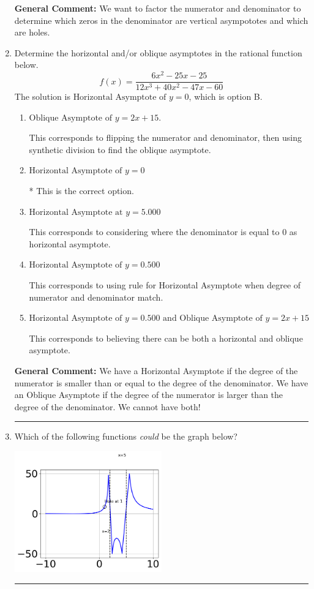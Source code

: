 \documentclass{extbook}[14pt]
\newcommand{\litem}[1]{\item #1

\rule{\textwidth}{0.4pt}}
\begin{document}
\begin{enumerate}
{\textbf{General Comment:} We want to factor the numerator and denominator to determine which zeros in the denominator are vertical asympototes and which are holes.
}
\litem{
Determine the horizontal and/or oblique asymptotes in the rational function below.
\[ f(x) = \frac{6x^{2} -25 x -25}{12x^{3} +40 x^{2} -47 x -60} \]The solution is \( \text{Horizontal Asymptote of } y = 0 \), which is option B.\begin{enumerate}[label=\Alph*.]
\item \( \text{Oblique Asymptote of } y = 2x + 15. \)

This corresponds to flipping the numerator and denominator, then using synthetic division to find the oblique asymptote.
\item \( \text{Horizontal Asymptote of } y = 0 \)

* This is the correct option.
\item \( \text{Horizontal Asymptote at } y = 5.000 \)

This corresponds to considering where the denominator is equal to 0 as horizontal asymptote.
\item \( \text{Horizontal Asymptote of } y = 0.500  \)

This corresponds to using rule for Horizontal Asymptote when degree of numerator and denominator match.
\item \( \text{Horizontal Asymptote of } y = 0.500 \text{ and Oblique Asymptote of } y = 2x + 15 \)

This corresponds to believing there can be both a horizontal and oblique asymptote.
\end{enumerate}

\textbf{General Comment:} We have a Horizontal Asymptote if the degree of the numerator is smaller than or equal to the degree of the denominator. We have an Oblique Asymptote if the degree of the numerator is larger than the degree of the denominator. We cannot have both!
}
\litem{
Which of the following functions \textit{could} be the graph below?

\begin{center}
    \includegraphics[width=0.5\textwidth]{../Figures/identifyGraphOfRationalFunctionB.png}
\end{center}


}
\end{enumerate}
\end{document}
